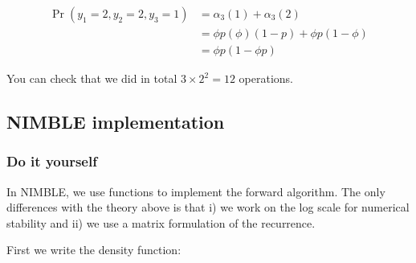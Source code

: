 \documentclass[
  12pt,
]{krantz}
\begin{document}
\begin{align*}
\Pr(y_1=2,y_2=2,y_3=1) &= \alpha_3(1) + \alpha_3(2)\\
            &= \phi p (\phi) (1-p) + \phi p (1-\phi)\\
            &= \phi p (1-\phi p)
\end{align*}

You can check that we did in total \(3 \times 2^2 = 12\) operations.

\subsection{NIMBLE implementation}\label{nimblemarginalization}

\subsubsection{Do it yourself}\label{diymarginalisation}

In NIMBLE, we use functions to implement the forward algorithm. The only differences with the theory above is that i) we work on the log scale for numerical stability and ii) we use a matrix formulation of the recurrence.

First we write the density function:
\end{document}
